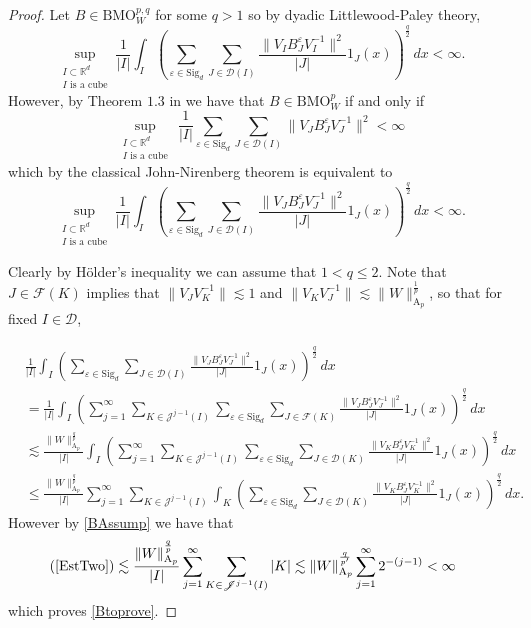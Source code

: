 \documentclass[12pt,reqno ]{amsart}
\numberwithin{equation}{section}
\theoremstyle{definition}
\newcommand{\R}{\ensuremath{\mathbb{R}}}
\newcommand{\D}{\ensuremath{\mathscr{D}}}
\newcommand{\J}{\ensuremath{\mathscr{J}}}
\newcommand{\F}{\ensuremath{\mathscr{F}}}
\newcommand{\BMOW}{\ensuremath{{\text{BMO}}_W ^p}}
\newcommand{\BMOWpq}{\ensuremath{{\text{BMO}}_W ^{p, q}}}
\renewcommand{\S}{\ensuremath{\text{Sig}_d}}
\begin{document}
\begin{proof} Let $B \in \BMOWpq$ for some $q > 1$ so by dyadic Littlewood-Paley theory,  \begin{equation} \label{BAssump}\sup_{\substack{I \subset \R^d \\  I \text{ is a cube}}} \frac{1}{|I|} \int_{I} \left( \sum_{\varepsilon \in \S} \sum_{J \in \D(I)} \frac{\|V_I B_J ^\varepsilon V_I ^{-1} \| ^2}{|J|} 1_J (x)  \right) ^\frac{q}{2} \, dx < \infty. \end{equation}  However, by Theorem $1.3$ in \cite{IKP} we have that $B \in \BMOW$ if and only if \begin{equation*} \sup_{\substack{I \subset \R^d \\  I \text{ is a cube}}} \, \frac{1}{|I|} \sum_{\varepsilon \in \S} \sum_{J \in \D(I)}  \|V_J B_J ^\varepsilon V_J ^{-1}\|^2 < \infty \end{equation*}  which by the classical John-Nirenberg theorem is equivalent to \begin{equation}  \label{Btoprove} \sup_{\substack{I \subset \R^d \\  I \text{ is a cube}}}  \frac{1}{|I|} \int_{I} \left( \sum_{\varepsilon \in \S}  \sum_{J \in \D(I)} \frac{\|V_J B_J ^\varepsilon V_J ^{-1} \| ^2}{|J|} 1_J (x)  \right) ^\frac{q}{2} \, dx < \infty. \end{equation}

Clearly by H\"{o}lder's inequality we can assume that $1 < q \leq 2$.  Note that  $J \in \F(K)$ implies that $\|V_J V_K^{-1}\| \lesssim 1$ and $\|V_K V_J^{-1}\| \lesssim \|W\|_{\text{A}_p} ^\frac{1}{p}$, so that for fixed $I \in \D$,


\begin{align}
&  \frac{1}{|I|} \int_{I} \left( \sum_{\varepsilon \in \S} \sum_{J \in \D(I)} \frac{\|V_J B_J ^\varepsilon V_J ^{-1} \| ^2}{|J|} 1_J (x)  \right) ^\frac{q}{2} \, dx \nonumber \\ & =
\frac{1}{|I|} \int_I \left( \sum_{j = 1} ^\infty \sum_{K \in \J^{j - 1} (I)} \sum_{\varepsilon \in \S} \sum_{J \in \F(K)}  \frac{\|V_J B_J ^\varepsilon V_J ^{-1} \|^2 }{|J|} 1_J (x) \right) ^\frac{q}{2} \, dx \nonumber \\ & \lesssim \frac{\|W\|_{\text{A}_p} ^\frac{q}{p}}{|I|}  \int_I \left(  \sum_{j = 1} ^\infty \sum_{K \in \J^{j - 1} (I)}  \sum_{\varepsilon \in \S} \sum_{J \in \D(K)} \frac{\|V_K B_J ^\varepsilon  V_K ^{-1} \|^2 }{|J|} 1_J (x) \right) ^ \frac{q}{2} \, dx \nonumber \\ & \leq  \frac{\|W\|_{\text{A}_p} ^\frac{q}{p}}{|I|}    \sum_{j = 1} ^\infty \sum_{K \in \J^{j - 1} (I)} \int_K \left( \sum_{\varepsilon \in \S} \sum_{J \in \D(K)} \frac{\|V_K B_J ^\varepsilon V_K ^{-1} \|^2 }{|J|} 1_J (x) \right) ^\frac{q}{2} \, dx. \label{EstTwo} \end{align}  However by \eqref{BAssump} we have that  \begin{align*} (\ref{EstTwo})  & \lesssim \frac{\|W\|_{\text{A}_p} ^\frac{q}{p}}{|I|}   \sum_{j = 1} ^\infty \sum_{K \in \J^{j - 1} (I)} |K|   \lesssim \|W\|_{\text{A}_p} ^\frac{q}{p'} \sum_{j = 1}^\infty 2^{-(j - 1)} < \infty \end{align*} which proves \eqref{Btoprove}. \end{proof}
\end{document}
